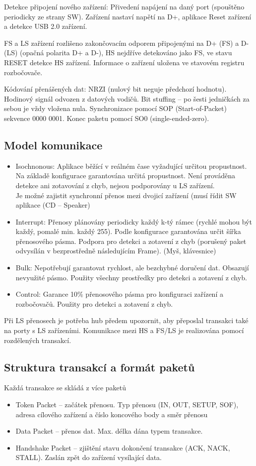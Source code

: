 \documentclass[a4paper, 11pt]{report}
\begin{document}
Detekce připojení nového zařízení: Přivedení napájení na daný port (spouštěno periodicky ze strany SW). Zařízení nastaví napětí na D+, aplikace Reset zařízení a detekce USB 2.0 zařízení.

FS a LS zařízení rozlišeno zakončovacím odporem připojenými na D+ (FS) a D- (LS) (opačná polarita D+ a D-), HS nejdříve detekováno jako FS, ve stavu RESET detekce HS zařízení. Informace o zařízení uložena ve stavovém registru rozbočovače.

Kódování přenášených dat: NRZI (nulový bit neguje předchozí hodnotu). Hodinový signál odvozen z datových vodičů. Bit stuffing -- po šesti jedničkách za sebou je vždy vložena nula. Synchronizace pomocí SOP (Start-of-Packet) sekvence 0000 0001. Konec paketu pomocí SO0 (single-ended-zero).

\subsection{Model komunikace}
\begin{itemize}
	\item Isochnonous: Aplikace běžící v reálném čase vyžadující určitou propustnost. Na základě konfigurace garantována určitá propustnost. Není prováděna detekce ani zotavování z chyb, nejsou podporovány u LS zařízení.\\
	Je možné zajistit synchronní přenos mezi dvojicí zařízení (musí řídit SW aplikace (CD -- Speaker)
	\item Interrupt: Přenosy plánovány periodicky každý k-tý rámec (rychlé mohou být každý, pomalé min. každý 255). Podle konfigurace garantována určit šířka přenosového pásma. Podpora pro detekci a zotavení z chyb (porušený paket odvysílán v bezprostředně následujícím Frame). (Myš, klávesnice)
	\item Bulk: Nepotřebují garantovat rychlost, ale bezchybné doručení dat. Obsazují nevyužité pásmo. Použity všechny prostředky pro detekci a zotavení z chyb.
	\item Control: Garance 10\% přenosového pásma pro konfiguraci zařízení a rozbočovačů. Použity pro detekci a zotavení z chyb.
\end{itemize}
Při LS přenosech je potřeba hub předem upozornit, aby přeposlal transakci také na porty s LS zařízeními. Komunikace mezi HS a FS/LS je realizována pomocí rozdělených transakcí.

\subsection{Struktura transakcí a formát paketů}
Každá transakce se skládá z více paketů
\begin{itemize}
	\item Token Packet -- začátek přenosu. Typ přenosu (IN, OUT, SETUP, SOF), adresa cílového zařízení a číslo koncového body a směr přenosu
	\item Data Packet -- přenos dat. Max. délka dána typem transakce.
	\item Handshake Packet -- zjištění stavu dokončení transakce (ACK, NACK, STALL). Zaslán zpět do zařízení vysílající data.
\end{itemize}
\end{document}
